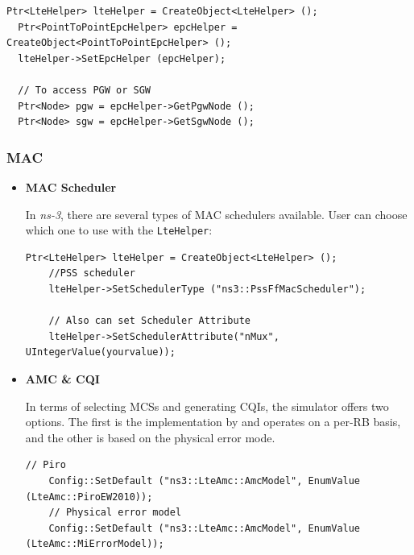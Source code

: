 \begin{lstlisting}[language=myC++,caption={Enable Evolved Packet Core}, captionpos=b]
  Ptr<LteHelper> lteHelper = CreateObject<LteHelper> ();
  Ptr<PointToPointEpcHelper> epcHelper = CreateObject<PointToPointEpcHelper> ();
  lteHelper->SetEpcHelper (epcHelper);

  // To access PGW or SGW 
  Ptr<Node> pgw = epcHelper->GetPgwNode ();
  Ptr<Node> sgw = epcHelper->GetSgwNode ();
\end{lstlisting}

\subsubsection{MAC}
\begin{itemize}
  \item \textbf{MAC Scheduler}
  
  In \textit{ns-3}, there are several types of MAC schedulers available. User can choose which 
  one to use with the \texttt{LteHelper}:

  \begin{lstlisting}[language=myC++,caption={MAC Scheduler}, captionpos=b]
    Ptr<LteHelper> lteHelper = CreateObject<LteHelper> ();
    //PSS scheduler
    lteHelper->SetSchedulerType ("ns3::PssFfMacScheduler");     

    // Also can set Scheduler Attribute
    lteHelper->SetSchedulerAttribute("nMux",                   UIntegerValue(yourvalue)); 
  \end{lstlisting}

  \item \textbf{AMC \& CQI}
  
  In terms of selecting MCSs and generating CQIs, the simulator offers two options. 
  The first is the implementation by \cite{piro} and operates on a per-RB basis, and the other 
  is based on the physical error mode.

  \begin{lstlisting}[language=myC++,caption={AMC Model}, captionpos=b]
    // Piro
    Config::SetDefault ("ns3::LteAmc::AmcModel", EnumValue (LteAmc::PiroEW2010));
    // Physical error model
    Config::SetDefault ("ns3::LteAmc::AmcModel", EnumValue (LteAmc::MiErrorModel));
  \end{lstlisting}
\end{itemize}


